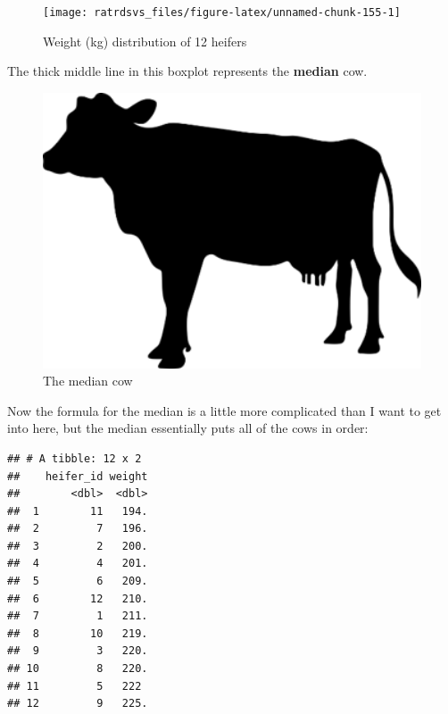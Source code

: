 \documentclass[
]{book}
\newenvironment{Shaded}{\begin{snugshade}}{\end{snugshade}}
\newcommand{\KeywordTok}[1]{\textcolor[rgb]{0.13,0.29,0.53}{\textbf{#1}}}
\newcommand{\NormalTok}[1]{#1}
\newcommand{\OperatorTok}[1]{\textcolor[rgb]{0.81,0.36,0.00}{\textbf{#1}}}
\newcommand{\StringTok}[1]{\textcolor[rgb]{0.31,0.60,0.02}{#1}}
\begin{document}
\begin{figure}

{\centering \texttt{[image: ratrdsvs\_files/figure-latex/unnamed-chunk-155-1]} 

}

\caption{Weight (kg) distribution of 12 heifers}\label{fig:unnamed-chunk-155}
\end{figure}

The thick middle line in this boxplot represents the \textbf{median} cow.

\begin{figure}

{\centering \includegraphics[width=4.75in]{images/09_statbasic/mediancow} 

}

\caption{The median cow}\label{fig:unnamed-chunk-156}
\end{figure}

Now the formula for the median is a little more complicated than I want to get into here, but the median essentially puts all of the cows in order:

\begin{Shaded}
\end{Shaded}

\begin{verbatim}
## # A tibble: 12 x 2
##    heifer_id weight
##        <dbl>  <dbl>
##  1        11   194.
##  2         7   196.
##  3         2   200.
##  4         4   201.
##  5         6   209.
##  6        12   210.
##  7         1   211.
##  8        10   219.
##  9         3   220.
## 10         8   220.
## 11         5   222 
## 12         9   225.
\end{verbatim}
\end{document}
